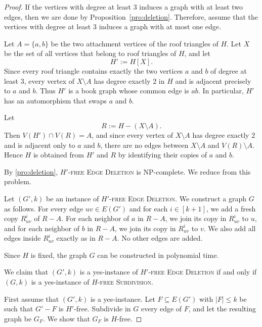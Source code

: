 \documentclass[a4paper,UKenglish,cleveref, autoref, thm-restate]{lipics-v2021}
\begin{document}
\begin{proof}

    If the vertices with degree at least 3 induces a graph with at least two edges, then we are done by Proposition~\ref{pro:deletion}.
    Therefore, assume that the vertices with degree at least 3 induces a graph with at most one edge. 

    Let $A=\{a,b\}$ be the two attachment vertices of the roof triangles of $H$.
    Let $X$ be the set of all vertices that belong to roof triangles of $H$, and let
    \[
        H':=H[X].
    \]
    Since every roof triangle contains exactly the two vertices $a$ and $b$ of degree at least $3$, every vertex of $X\setminus A$ has degree exactly $2$ in $H$ and is adjacent precisely to $a$ and $b$.
    Thus $H'$ is a book graph whose common edge is $ab$.
    In particular, $H'$ has an automorphism that swaps $a$ and $b$.

    Let
    \[
        R:=H-(X\setminus A).
    \]
    Then $V(H')\cap V(R)=A$, and since every vertex of $X\setminus A$ has degree exactly $2$ and is adjacent only to $a$ and $b$, there are no edges between $X\setminus A$ and $V(R)\setminus A$.
    Hence $H$ is obtained from $H'$ and $R$ by identifying their copies of $a$ and $b$.

    By \cref{pro:deletion}, \textsc{$H'$-free Edge Deletion} is NP-complete.
    We reduce from this problem.

    Let $(G',k)$ be an instance of \textsc{$H'$-free Edge Deletion}.
    We construct a graph $G$ as follows.
    For every edge $uv\in E(G')$ and for each $i\in [k+1]$, we add a fresh copy $R_{uv}^i$ of $R-A$.
    For each neighbor of $a$ in $R-A$, we join its copy in $R_{uv}^i$ to $u$, and for each neighbor of $b$ in $R-A$, we join its copy in $R_{uv}^i$ to $v$.
    We also add all edges inside $R_{uv}^i$ exactly as in $R-A$.
    No other edges are added.

    Since $H$ is fixed, the graph $G$ can be constructed in polynomial time.

    We claim that $(G',k)$ is a yes-instance of \textsc{$H'$-free Edge Deletion} if and only if $(G,k)$ is a yes-instance of \textsc{$H$-free Subdivision}.

    First assume that $(G',k)$ is a yes-instance.
    Let $F\subseteq E(G')$ with $|F|\le k$ be such that $G'-F$ is $H'$-free.
    Subdivide in $G$ every edge of $F$, and let the resulting graph be $G_F$.
    We show that $G_F$ is $H$-free.


\end{proof}
\end{document}
